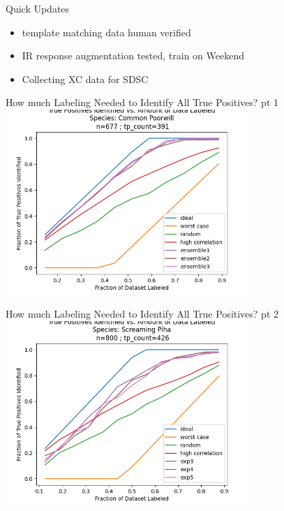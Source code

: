

\begin{frame}{Quick Updates}
    \begin{itemize}
        \item template matching data human verified
        \item IR response augmentation tested, train on Weekend
        \item Collecting XC data for SDSC
    \end{itemize} 
\end{frame}

\begin{frame}{How much Labeling Needed to Identify All True Positives? pt 1}
    \centering
    \includegraphics[height=0.7\textheight,width=0.7\textwidth,keepaspectratio]{images/aid/poorwill.png}
\end{frame}

\begin{frame}{How much Labeling Needed to Identify All True Positives? pt 2}
    \centering
    \includegraphics[height=0.7\textheight,width=0.7\textwidth,keepaspectratio]{images/aid/piha.png}
\end{frame}

